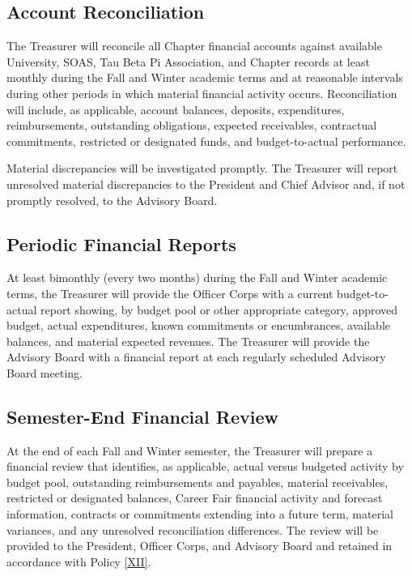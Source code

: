 
\subsection{Account Reconciliation} \label{VII.1}
The Treasurer will reconcile all Chapter financial accounts against available University, SOAS, Tau Beta Pi Association, and Chapter records at least 
monthly during the Fall and Winter academic terms and at reasonable intervals during other periods in which material financial activity occurs. 
Reconciliation will include, as applicable, account balances, deposits, expenditures, reimbursements, outstanding obligations, expected receivables, contractual commitments, 
restricted or designated funds, and budget-to-actual performance.

Material discrepancies will be investigated promptly. 
The Treasurer will report unresolved material discrepancies to the President and Chief Advisor and, if not promptly resolved, to the Advisory Board.

\subsection{Periodic Financial Reports} \label{VII.2}
At least bimonthly (every two months) during the Fall and Winter academic terms, the Treasurer will provide the Officer Corps with a current budget-to-actual report showing, 
by budget pool or other appropriate category, approved budget, actual expenditures, known commitments or encumbrances, available balances, and material expected revenues. 
The Treasurer will provide the Advisory Board with a financial report at each regularly scheduled Advisory Board meeting.

\subsection{Semester-End Financial Review} \label{VII.3}
At the end of each Fall and Winter semester, the Treasurer will prepare a financial review that identifies, as applicable, actual versus budgeted activity by budget pool, 
outstanding reimbursements and payables, material receivables, restricted or designated balances, Career Fair financial activity and forecast information, 
contracts or commitments extending into a future term, material variances, and any unresolved reconciliation differences. 
The review will be provided to the President, Officer Corps, and Advisory Board and retained in accordance with Policy \ref{XII}.